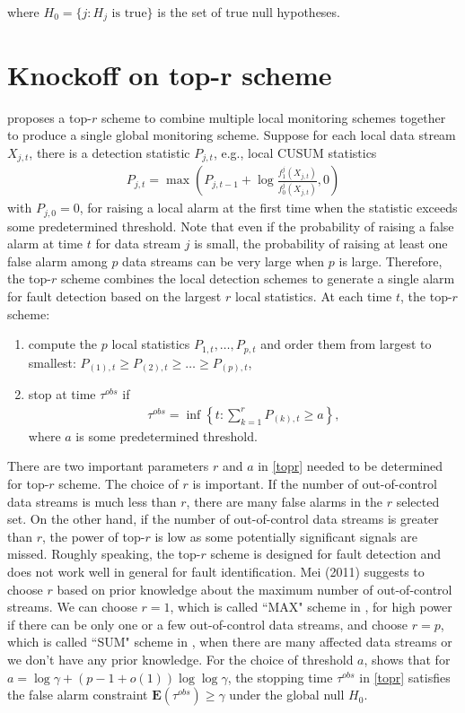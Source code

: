 \documentclass[]{interact}
\theoremstyle{plain}%
\theoremstyle{definition}
\theoremstyle{remark}
\begin{document}
where $H_0 = \{j: H_j \text{ is true}\}$ is the set of true null hypotheses.


\section{Knockoff on top-r scheme}

\cite{mei2011quickest} proposes a top-$r$ scheme to combine multiple local monitoring schemes together to produce a single global monitoring scheme. Suppose for each local data stream $X_{j,t}$, there is a detection statistic $P_{j,t}$, e.g., local CUSUM statistics
\begin{align}
P_{j,t} = \max \left( P_{j,t-1}+ \log \frac{f_1^j(X_{j,t})}{f_0^j(X_{j,t})}, 0 \right)\label{CUSUMtopr}
\end{align}
with $P_{j,0}=0$, for raising a local alarm at the first time when the statistic exceeds some predetermined threshold. Note that even if the probability of raising a false alarm at time $t$ for data stream $j$ is small, the probability of raising at least one false alarm among $p$ data streams can be very large when $p$ is large. Therefore, the top-$r$ scheme combines the local detection schemes to generate a single alarm for fault detection based on the largest $r$ local statistics. At each time $t$, the top-$r$ scheme:
\begin{enumerate}
\item compute the $p$ local statistics $P_{1,t},\ldots,P_{p,t}$ and order them from largest to smallest: $P_{(1),t} \ge P_{(2),t} \ge \dots \ge P_{(p),t}$,
\item stop at time $\tau^{obs}$ if
\begin{align}
\tau^{obs}=\inf \left\{ t: \sum_{k=1}^r P_{(k), t}\ge a \right\},\label{topr}
\end{align}
where $a$ is some predetermined threshold.
\end{enumerate} 
There are two important parameters $r$ and $a$ in \eqref{topr} needed to be determined for top-$r$ scheme. The choice of $r$ is important. If the number of out-of-control data streams is much less than $r$, there are many false alarms in the $r$ selected set. On the other hand, if the number of out-of-control data streams is greater than $r$, the power of top-$r$ is low as some potentially significant signals are missed. Roughly speaking, the top-$r$ scheme is designed for fault detection and does not work well in general for fault identification. Mei (2011) suggests to choose $r$ based on prior knowledge about the maximum number of out-of-control streams. We can choose $r=1$, which is called ``MAX" scheme in \cite{mei2011quickest}, for high power if there can be only one or a few out-of-control data streams, and choose $r=p$, which is called ``SUM" scheme in \cite{mei2011quickest}, when there are many affected data streams or we don't have any prior knowledge. For the choice of threshold $a$, \cite{mei2011quickest} shows that for $a = \log\gamma + (p-1+o(1))\log\log\gamma$, the stopping time $\tau^{obs}$ in \eqref{topr} satisfies the false alarm constraint $\mathbf{E}(\tau^{obs}) \ge \gamma$ under the global null $H_0$.
\end{document}
